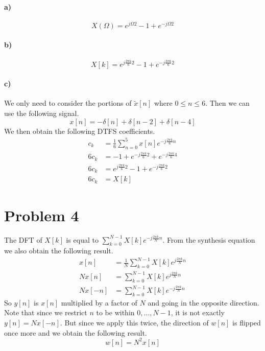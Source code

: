 \documentclass[12pt]{article}
\begin{document}
\paragraph{a)}

\[X(\Omega)=e^{j\Omega 2} - 1 + e^{-j\Omega 2}\]

\paragraph{b)}

\[X[k]=e^{j\frac{2\pi k}{6} 2} - 1 + e^{-j\frac{2\pi k}{6} 2}\]

\paragraph{c)}

We only need to consider the portions of \(\tilde{x}[n]\) where \(0\leq n \leq 6\). Then we can use the following signal.
\[x[n] = -\delta[n] + \delta[n-2] + \delta[n-4]\]
We then obtain the following DTFS coefficients.
\begin{align*}
    c_k&=\frac{1}{6}\sum_{n=0}^5 x[n] e^{-j\frac{2\pi k}{6} n}\\
    6c_k&=-1 + e^{-j\frac{2\pi k}{6} 2} + e^{-j\frac{2\pi k}{6} 4}\\
    6c_k&=e^{j\frac{2\pi k}{6} 2} - 1 + e^{-j\frac{2\pi k}{6} 2} \\
    6c_k&=X[k]
\end{align*}

\section*{Problem 4}

The DFT of \(X[k]\) is equal to \(\sum_{k=0}^{N-1} X[k]e^{-j\frac{2\pi k}{N}n}\). From the
synthesis equation we also obtain the following result.
\begin{align*}
    x[n]&=\frac{1}{N}\sum_{k=0}^{N-1} X[k]e^{j\frac{2\pi k}{N}n}\\
    Nx[n]&=\sum_{k=0}^{N-1} X[k]e^{j\frac{2\pi k}{N}n}\\
    Nx[-n]&=\sum_{k=0}^{N-1} X[k]e^{-j\frac{2\pi k}{N}n}
\end{align*}
So \(y[n]\) is \(x[n]\) multiplied by a factor of \(N\) and going in the opposite direction.
Note that since we restrict \(n\) to be within \(0,\ldots, N-1\), it is not exactly \(y[n]=Nx[-n]\).
But since we apply this twice, the direction of \(w[n]\) is flipped once more and we obtain the
following result.
\[w[n]=N^2x[n]\]
\end{document}
